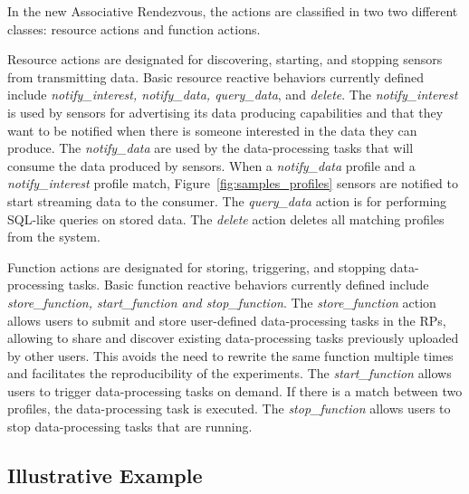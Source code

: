 In the new Associative Rendezvous, the actions are classified in two two different classes: resource actions and function actions. 

Resource actions are designated for discovering, starting, and stopping sensors from transmitting data. Basic resource reactive behaviors currently defined include {\it notify\_interest, notify\_data, query\_data}, and {\it delete}. The {\it notify\_interest} is used by sensors for advertising its data producing capabilities and that they want to be notified when there is someone interested in the data they can produce. The {\it notify\_data} are used by the data-processing tasks that will consume the data produced by sensors. When a {\it notify\_data} profile and a {\it notify\_interest} profile match, Figure~\ref{fig:samples_profiles} sensors are notified to start streaming data to the consumer. The {\it query\_data } action is for performing SQL-like queries on stored data. The {\it delete} action deletes all matching profiles from the system.

Function actions are designated for storing, triggering, and stopping data-processing tasks. Basic function reactive behaviors currently defined include {\it store\_function, start\_function and stop\_function}. The {\it store\_function} action allows users to submit and store user-defined data-processing tasks in the RPs, allowing to share and discover existing data-processing tasks previously uploaded by other users. This avoids the need to rewrite the same function multiple times and facilitates the reproducibility of the experiments. The {\it start\_function} allows users to trigger data-processing tasks on demand. %
If there is a match between two profiles, the data-processing task is executed. The {\it stop\_function} allows users to stop data-processing tasks that are running. %


\subsection{Illustrative Example}


